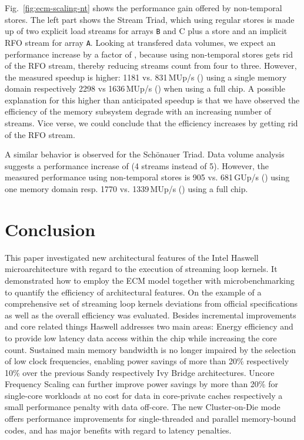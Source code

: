 \documentclass{llncs}
\begin{document}
Fig.~\ref{fig:ecm-scaling-nt} shows the performance gain offered by
non-temporal stores. The left part shows the Stream Triad, which using regular
stores is made up of two explicit load streams for arrays \texttt{B} and {C}
plus a store and an implicit \ac{RFO} stream for array \texttt{A}. Looking at
transfered data volumes, we expect an performance increase by a factor of
, because using non-temporal stores gets rid of the \ac{RFO}
stream, thereby reducing streams count from four to three.  However, the
measured speedup is higher: 1181 vs.  831\,MUp/s () using a single
memory domain respectively 2298 vs 1636\,MUp/s () when using a
full chip.  A possible explanation for this higher than anticipated speedup is
that we have observed the efficiency of the memory subsystem degrade with an
increasing number of streams. Vice verse, we could conclude that the efficiency
increases by getting rid of the \ac{RFO} stream.

A similar behavior is observed for the Sch\"onauer Triad. Data volume analysis
suggests a performance increase of  (4 streams instead of 5).
However, the measured performance using non-temporal stores is 905 vs.
681\,GUp/s () using one memory domain resp. 1770 vs.  1339\,MUp/s
() using a full chip.


\section{Conclusion}
This paper investigated new architectural features of the Intel Haswell
microarchitecture with regard to the execution of streaming loop kernels. It
demonstrated how to employ the \ac{ECM} model together with microbenchmarking
to quantify the efficiency of architectural features. On the example of a
comprehensive set of streaming loop kernels deviations from official
specifications as well as the overall efficiency was evaluated. Besides
incremental improvements and core related things Haswell addresses two main
areas: Energy efficiency and to provide low latency data access within the chip
while increasing the core count.  Sustained main memory bandwidth is no longer
impaired by the selection of low clock frequencies, enabling power savings of
more than 20\% respectively 10\% over the previous Sandy respectively Ivy
Bridge architectures. Uncore Frequency Scaling can further improve power
savings by more than 20\% for single-core workloads at no cost for data in
core-private caches respectively a small performance penalty with data
off-core.  The new Cluster-on-Die mode offers performance improvements for
single-threaded and parallel memory-bound codes, and has major benefits with
regard to latency penalties.



\end{document}
